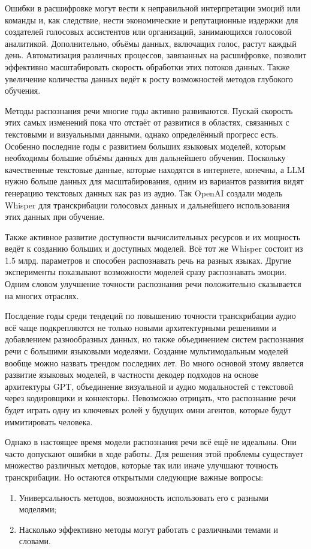 Ошибки в расшифровке могут вести к неправильной интерпретации эмоций или команды и, как следствие, нести экономические и репутационные издержки для создателей голосовых ассистентов или организаций, занимающихся голосовой аналитикой.
Дополнительно, объёмы данных, включащих голос, растут каждый день.
Автоматизация различных процессов, завязанных на расшифровке, позволит эффективно масштабировать скорость обработки этих потоков данных.
Также увеличение количества данных ведёт к росту возможностей методов глубокого обучения.

Методы распознания речи многие годы активно развиваются.
Пускай скорость этих самых изменений пока что отстаёт от развитися в областях, связанных с текстовыми и визуальными данными, однако определённый прогресс есть.
Особенно последние годы с развитием больших языковых моделей, которым необходимы большие объёмы данных для дальнейшего обучения.
Поскольку качественные текстовые данные, которые находятся в интернете, конечны, а LLM нужно больше данных для масштабирования, одним из вариантов развития видят генерацию текстовых данных как раз из аудио.
Так OpenAI создали модель Whisper для транскрибации голосовых данных и дальнейшего использования этих данных при обучение.

Также активное развитие доступности вычислительных ресурсов и их мощность ведёт к созданию больших и доступных моделей.
Всё тот же Whisper состоит из 1.5 млрд. параметров и способен распознавать речь на разных языках.
Другие эксперименты показывают возможности моделей сразу распознавать эмоции.
Одним словом улучшение точности распознания речи положительно сказывается на многих отраслях.

Послдение годы среди тендеций по повышению точности транскрибации аудио всё чаще подкрепляются не только новыми архитектурными решениями и добавлением разнообразных данных, но также объединением систем распознания речи с большими языковыми моделями.
Создание мультимодальным моделей вообще можно назвать трендом последних лет.
Во много основой этому является развитие языковых моделей, в частности декодер подходов на основе архитектуры GPT, объединение визуальной и аудио модальностей с текстовой через кодировщики и коннекторы.
Невозможно отрицать, что распознание речи будет играть одну из ключевых ролей у будущих омни агентов, которые будут иммитировать человека.

Однако в настоящее время модели распознания речи всё ещё не идеальны.
Они часто допускают ошибки в ходе работы.
Для решения этой проблемы существует множество различных методов, которые так или иначе улучшают точность транскрибации.
Но остаются открытыми следующие важные вопросы:
\begin{enumerate}
\item Универсальность методов, возможность использовать его с разными моделями;
\item Насколько эффективно методы могут работать с различными темами и словами.
\end{enumerate}

